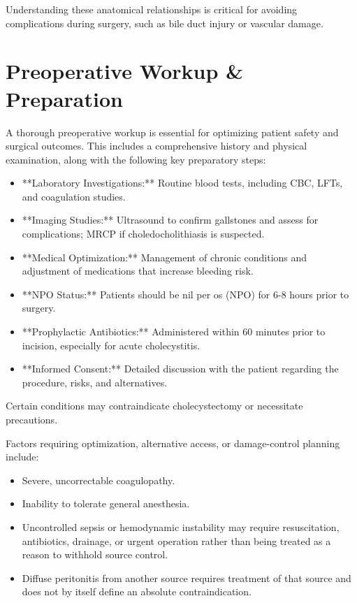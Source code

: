Understanding these anatomical relationships is critical for avoiding complications during surgery, such as bile duct injury or vascular damage.

\section*{Preoperative Workup \& Preparation}
A thorough preoperative workup is essential for optimizing patient safety and surgical outcomes. This includes a comprehensive history and physical examination, along with the following key preparatory steps:

\begin{itemize}
  \item **Laboratory Investigations:** Routine blood tests, including CBC, LFTs, and coagulation studies.
  \item **Imaging Studies:** Ultrasound to confirm gallstones and assess for complications; MRCP if choledocholithiasis is suspected.
  \item **Medical Optimization:** Management of chronic conditions and adjustment of medications that increase bleeding risk.
  \item **NPO Status:** Patients should be nil per os (NPO) for 6-8 hours prior to surgery.
  \item **Prophylactic Antibiotics:** Administered within 60 minutes prior to incision, especially for acute cholecystitis.
  \item **Informed Consent:** Detailed discussion with the patient regarding the procedure, risks, and alternatives.
\end{itemize}

Certain conditions may contraindicate cholecystectomy or necessitate precautions. 

Factors requiring optimization, alternative access, or damage-control planning include:

\begin{itemize}
  \item Severe, uncorrectable coagulopathy.
  \item Inability to tolerate general anesthesia.
  \item Uncontrolled sepsis or hemodynamic instability may require resuscitation, antibiotics, drainage, or urgent operation rather than being treated as a reason to withhold source control.
  \item Diffuse peritonitis from another source requires treatment of that source and does not by itself define an absolute contraindication.
\end{itemize}

